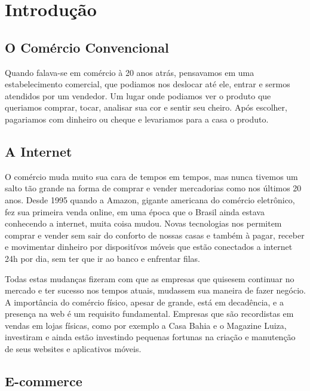 \chapter{Introdução}

\section{O Comércio Convencional}

Quando falava-se em comércio à 20 anos atrás, pensavamos em uma estabelecimento comercial, que podiamos nos deslocar até ele, entrar e sermos atendidos por um vendedor. Um lugar onde podiamos ver o produto que queriamos comprar, tocar, analisar sua cor e sentir seu cheiro. Após escolher, pagariamos com dinheiro ou cheque e levariamos para a casa o produto.

\section{A Internet}

O comércio muda muito sua cara de tempos em tempos, mas nunca tivemos um salto tão grande na forma de comprar e vender mercadorias como nos últimos 20 anos. Desde 1995 quando a Amazon, gigante americana do comércio eletrônico, fez sua primeira venda online, em uma época que o Brasil ainda estava conhecendo a internet, muita coisa mudou. Novas tecnologias nos permitem comprar e vender sem sair do conforto de nossas casas e também à pagar, receber e movimentar dinheiro por dispositívos móveis que estão conectados a internet 24h por dia, sem ter que ir ao banco e enfrentar filas.

Todas estas mudanças fizeram com que as empresas que quisesem continuar no mercado e ter sucesso nos tempos atuais, mudassem sua maneira de fazer negócio. A importância do comércio físico, apesar de grande, está em decadência, e a presença na web é um requisito fundamental. Empresas que são recordistas em vendas em lojas físicas, como por exemplo a Casa Bahia e o Magazine Luiza, investiram e ainda estão investindo pequenas fortunas na criação e manutenção de seus websites e aplicativos móveis.

\section{E-commerce}

